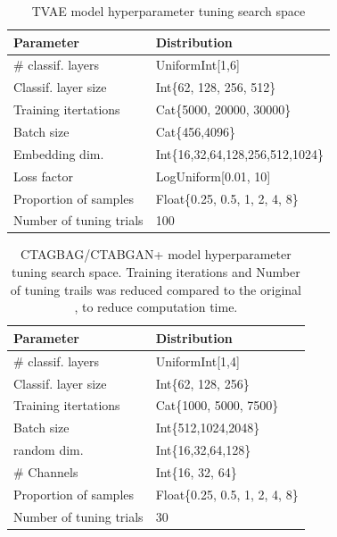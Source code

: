 \begin{table}[h]
	\centering
	\begin{tabular}{l | l }
		\hline
		Parameter               & Distribution                     \\
		\hline
		\# classif. layers      & UniformInt[1,6]                  \\
		Classif. layer size     & Int\{62, 128, 256, 512\}         \\
		Training itertations    & Cat\{5000, 20000, 30000\}        \\
		Batch size              & Cat\{456,4096\}                  \\
		Embedding dim.          & Int\{16,32,64,128,256,512,1024\} \\
		Loss factor             & LogUniform[0.01, 10]             \\
		Proportion of samples   & Float\{0.25, 0.5, 1, 2, 4, 8\}   \\
		\hline
		Number of tuning trials & 100
	\end{tabular}
	\caption{TVAE model hyperparameter tuning search space}
	\label{tab:tvae_tune}

\end{table}

\begin{table}[h]
	\centering
	\begin{tabular}{l | l }
		\hline
		Parameter               & Distribution                   \\
		\hline
		\# classif. layers      & UniformInt[1,4]                \\
		Classif. layer size     & Int\{62, 128, 256\}            \\
		Training itertations    & Cat\{1000, 5000, 7500\}        \\
		Batch size              & Int\{512,1024,2048\}           \\
		random dim.             & Int\{16,32,64,128\}            \\
		\# Channels             & Int\{16, 32, 64\}              \\
		Proportion of samples   & Float\{0.25, 0.5, 1, 2, 4, 8\} \\
		\hline
		Number of tuning trials & 30
	\end{tabular}
	\caption{CTAGBAG/CTABGAN+ model hyperparameter tuning search space. Training iterations and Number of tuning trails was reduced compared to the original \cite{kotelnikov2022TabDDPMModellingTabular}, to reduce computation time.}
	\label{tab:ctabgan_tune}
\end{table}

